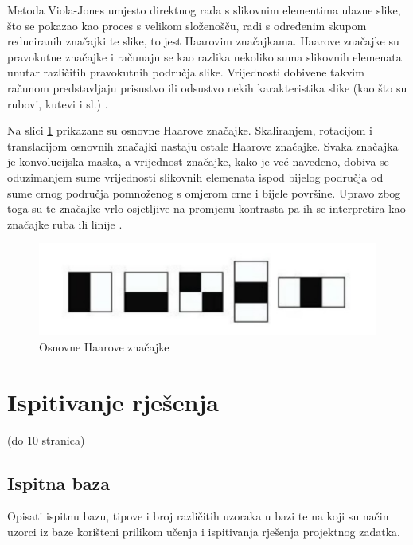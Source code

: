 \documentclass[times, utf8, zavrsni, numeric]{fer}
\begin{document}
Metoda Viola-Jones umjesto direktnog rada s slikovnim elementima ulazne slike, što se pokazao kao proces s velikom složenošču, radi s određenim skupom reduciranih značajki te slike, to jest Haarovim značajkama. Haarove značajke su pravokutne značajke i računaju se kao razlika nekoliko suma slikovnih elemenata unutar različitih pravokutnih područja slike. Vrijednosti dobivene takvim računom predstavljaju prisustvo ili odsustvo nekih karakteristika slike (kao što su rubovi, kutevi i sl.) \citep{culjakRad}.

Na slici \ref{fig:haar} prikazane su osnovne Haarove značajke. Skaliranjem, rotacijom i translacijom osnovnih značajki nastaju ostale Haarove značajke. Svaka značajka je konvolucijska maska, a vrijednost značajke, kako je već navedeno, dobiva se oduzimanjem sume vrijednosti slikovnih elemenata ispod bijelog područja od sume crnog područja pomnoženog s omjerom crne i bijele površine. Upravo zbog toga su te značajke vrlo osjetljive na promjenu kontrasta pa ih se interpretira kao značajke ruba ili linije \citep{franicRad}.

\begin{figure}[htb]
    \centering
    \includegraphics[width=12cm]{images/haar.png}
    \caption{Osnovne Haarove značajke}
    \label{fig:haar}
\end{figure}

















\chapter{Ispitivanje rješenja}
(do 10 stranica)

\section{Ispitna baza}
Opisati ispitnu bazu, tipove i broj različitih uzoraka u bazi te na koji su način uzorci iz baze korišteni prilikom učenja i ispitivanja rješenja projektnog zadatka. 
\end{document}
